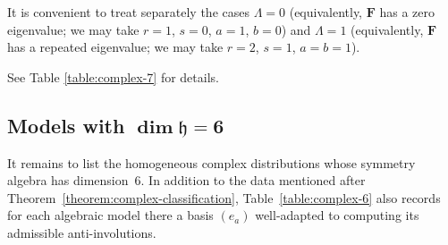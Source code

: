 \documentclass[pdftex]{sigma}
\newcommand{\mbF}{\mathbf{F}}
\newcommand{\mfh} {\mathfrak{h}}
\numberwithin{equation}{section}
\begin{document}
It is convenient to treat separately the cases $\Lambda = 0$ (equivalently, $\mbF$ has a zero eigenvalue; we may take $r = 1$, $s = 0$, $a = 1$, $b = 0$) and $\Lambda = 1$ (equivalently, $\mbF$ has a repeated eigenvalue; we may take $r = 2$, $s = 1$, $a = b = 1$).

See Table \ref{table:complex-7} for details.

\subsection[Models with $\dim \mfh = 6$]{Models with $\boldsymbol{\dim \mfh = 6}$}
It remains to list the homogeneous complex distributions whose symmetry algebra has dimen\-sion~$6$. In addition to the data mentioned after Theorem~\ref{theorem:complex-classification}, Table~\ref{table:complex-6} also records for each algebraic model there a basis $(e_a)$ well-adapted to computing its admissible anti-involutions.
\end{document}
